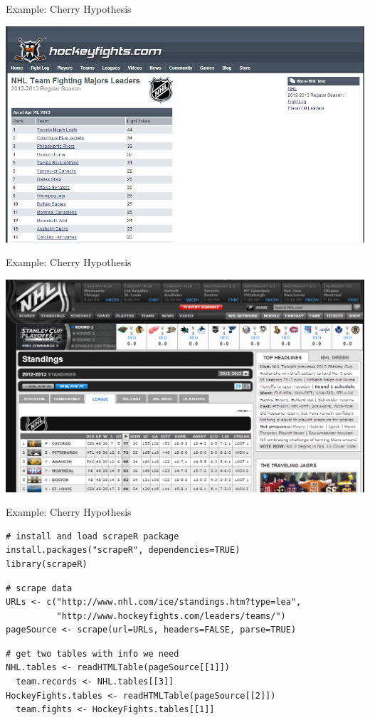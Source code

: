 \documentclass{beamer}
\begin{document}
\begin{frame}{Example: Cherry Hypothesis}
  \begin{center}
    \includegraphics[scale=.45]{"HockeyFights website"}
  \end{center}
\end{frame}


\begin{frame}{Example: Cherry Hypothesis}
  \begin{center}
    \includegraphics[scale=.45]{"NHL website"}
  \end{center}
\end{frame}



\begin{frame}[fragile]{Example: Cherry Hypothesis}
  \begin{verbatim}
# install and load scrapeR package
install.packages("scrapeR", dependencies=TRUE)
library(scrapeR) 
\end{verbatim} \pause 

\begin{verbatim}
# scrape data
URLs <- c("http://www.nhl.com/ice/standings.htm?type=lea",
          "http://www.hockeyfights.com/leaders/teams/")
pageSource <- scrape(url=URLs, headers=FALSE, parse=TRUE)  
\end{verbatim} \pause

\begin{verbatim}
# get two tables with info we need
NHL.tables <- readHTMLTable(pageSource[[1]])
  team.records <- NHL.tables[[3]]
HockeyFights.tables <- readHTMLTable(pageSource[[2]])
  team.fights <- HockeyFights.tables[[1]]
  \end{verbatim}
\end{frame}
\end{document}

